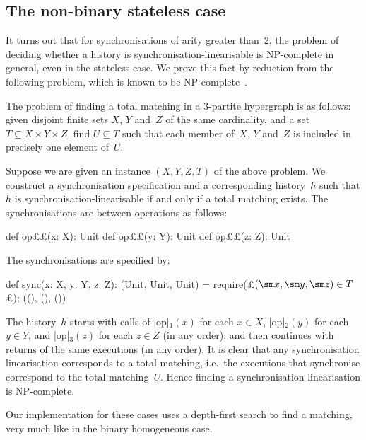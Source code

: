 
\subsection{The non-binary stateless case}
\label{sec:non-binary-stateless}

It turns out that for synchronisations of arity greater than~2, the problem of
deciding whether a history is synchronisation-linearisable is NP-complete in
general, even in the stateless case.  We prove this fact by reduction from the
following problem, which is known to be NP-complete~\cite{Karp1972}.
%
\begin{definition}
The problem of finding a total matching in a 3-partite hypergraph is as
follows: given disjoint finite sets $X$, $Y$ and~$Z$ of the same cardinality,
and a set $T \subseteq X \times Y \times Z$, find $U \subseteq T$ such that
each member of~$X$, $Y$ and~$Z$ is included in precisely one element of~$U$.
\end{definition}

Suppose we are given an instance $(X, Y, Z, T)$ of the above problem.  We
construct a synchronisation specification and a corresponding history~$h$ such
that $h$ is synchronisation-linearisable if and only if a total matching
exists.  The synchronisations are between operations as follows:
\begin{scala}
  def op££(x: X): Unit
  def op££(y: Y): Unit
  def op££(z: Z): Unit
\end{scala}
%
The synchronisations are specified by:
%
\begin{scala}
  def sync(x: X, y: Y, z: Z): (Unit, Unit, Unit) = {
    require(£$(\sm x, \sm y, \sm z) \in T$£); ((), (), ())
  }
\end{scala}
%
The history~$h$ starts with calls of |op|$_1(x)$ for each $x \in X$,
|op|$_2(y)$ for each $y \in Y$, and |op|$_3(z)$ for each $z \in Z$ (in any
order); and then continues with returns of the same executions (in any
order).  It is clear that any synchronisation linearisation corresponds to a
total matching, i.e.~the executions that synchronise correspond to the
total matching~$U$.  Hence finding a synchronisation linearisation is
NP-complete. 

Our implementation for these cases uses a depth-first search to find a
matching, very much like in the binary homogeneous case.

